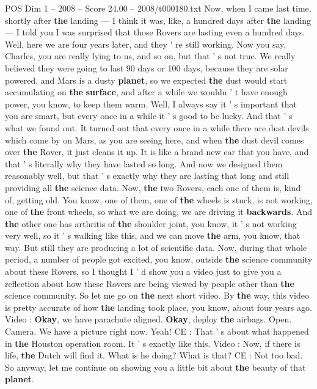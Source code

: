 \begin{textsample}{POS Dim 1 – 2008 – Score 24.00 – 2008/t000180.txt}
Now, when I came last time, shortly after \textbf{the} landing — I think it was, like, a hundred days after \textbf{the} landing — I told you I was surprised that those Rovers are lasting even a hundred days.
Well, here we are four years later, and they ' re still working.
Now you say, Charles, you are really lying to us, and so on, but that ' s not true.
We really believed they were going to last 90 days or 100 days, because they are solar powered, and Mars is a dusty \textbf{planet}, so we expected \textbf{the} dust would start accumulating on \textbf{the} \textbf{surface}, and after a while we wouldn ' t have enough power, you know, to keep them warm.
Well, I always say it ' s important that you are smart, but every once in a while it ' s good to be lucky.
And that ' s what we found out.
It turned out that every once in a while there are dust devils which come by on Mars, as you are seeing here, and when \textbf{the} dust devil comes over \textbf{the} Rover, it just cleans it up.
It is like a brand new car that you have, and that ' s literally why they have lasted so long.
And now we designed them reasonably well, but that ' s exactly why they are lasting that long and still providing all \textbf{the} science data.
Now, \textbf{the} two Rovers, each one of them is, kind of, getting old.
You know, one of them, one of \textbf{the} wheels is stuck, is not working, one of \textbf{the} front wheels, so what we are doing, we are driving it \textbf{backwards}.
And \textbf{the} other one has arthritis of \textbf{the} shoulder joint, you know, it ' s not working very well, so it ' s walking like this, and we can move \textbf{the} arm, you know, that way.
But still they are producing a lot of scientific data.
Now, during that whole period, a number of people got excited, you know, outside \textbf{the} science community about these Rovers, so I thought I ' d show you a video just to give you a reflection about how these Rovers are being viewed by people other than \textbf{the} science community.
So let me go on \textbf{the} next short video.
By \textbf{the} way, this video is pretty accurate of how \textbf{the} landing took place, you know, about four years ago.
Video : \textbf{Okay}, we have parachute aligned. \textbf{Okay}, deploy \textbf{the} airbags.
Open.
Camera.
We have a picture right now.
Yeah!
CE : That ' s about what happened in \textbf{the} Houston operation room.
It ' s exactly like this.
Video : Now, if there is life, \textbf{the} Dutch will find it.
What is he doing?
What is that?
CE : Not too bad.
So anyway, let me continue on showing you a little bit about \textbf{the} beauty of that \textbf{planet}.

\end{textsample}
